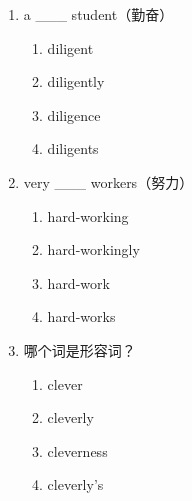 \documentclass[11pt,a4paper]{ctexart}
\begin{document}
\begin{enumerate}[leftmargin=*,itemsep=4pt]
\begin{enumerate}[label=\Alph*.,leftmargin=2em,itemsep=1pt,topsep=2pt]
\end{enumerate}
\item a \_\_\_ student（勤奋）
\begin{enumerate}[label=\Alph*.,leftmargin=2em,itemsep=1pt,topsep=2pt]
\item diligent
\item diligently
\item diligence
\item diligents
\end{enumerate}
\item very \_\_\_ workers（努力）
\begin{enumerate}[label=\Alph*.,leftmargin=2em,itemsep=1pt,topsep=2pt]
\item hard-working
\item hard-workingly
\item hard-work
\item hard-works
\end{enumerate}
\item 哪个词是形容词？
\begin{enumerate}[label=\Alph*.,leftmargin=2em,itemsep=1pt,topsep=2pt]
\item clever
\item cleverly
\item cleverness
\item cleverly’s
\end{enumerate}
\end{enumerate}
\end{document}
